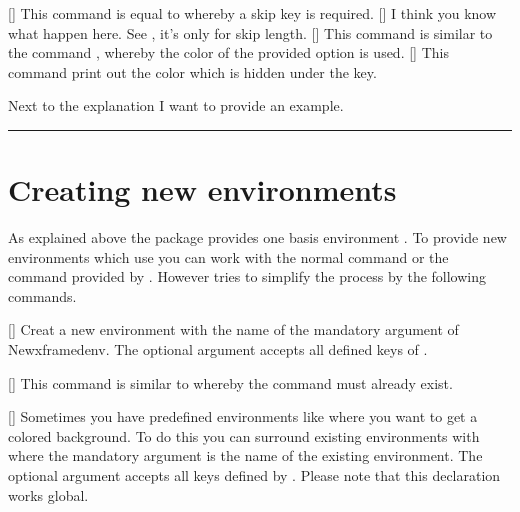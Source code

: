 \documentclass[openany,12pt,tocdepth=3]{ltx-md}
\begin{document}
[\MArgs[key]]
This command is equal to  whereby
a skip key is required.
[\MArgs[key]]
I think you know what happen here. See , 
it's only for skip length.
[\MArgs[key]]
This command is similar to the command , whereby the
color of the provided option is used.
[\MArgs[key]]
This command print out the color which is hidden under the key.

Next to the explanation I want to provide an example. 

\begin{ltxexample}[caption=Example of helper functions,label=helper,result=true,]
 \begin{xframed}[margin=3cm]
    \centering
    \rule{}{2pt}%
 \end{xframed}
\end{ltxexample}


\section{Creating new environments}\label{sec:newenv}

As explained above the package  provides
one basis environment . To provide new
environments which use  you can work with
the normal \LaTeXe command  or
the command  provided
by . However  tries to simplify
the process by the following commands.

[\OArgs{}]
Creat a new environment with the name of the mandatory argument
of {Newxframedenv}. The optional argument accepts all
defined keys of .

[]
This command is similar to  whereby
the command must already exist.

[\OArgs{}]
Sometimes you have predefined environments like 
where you want to get a colored background. To do this you can 
surround existing environments with 
where the mandatory argument is the name of the existing environment.
The optional argument accepts all keys defined by .
Please note that this declaration works global.
\end{document}
